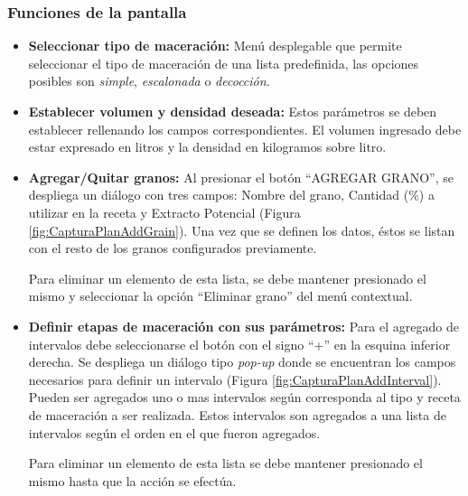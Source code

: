             \subsubsection{Funciones de la pantalla}
                \begin{itemize}
                    \item \textbf{Seleccionar tipo de maceración:} Menú desplegable que permite seleccionar el tipo de maceración de una lista predefinida, las opciones posibles son \textit{simple}, \textit{escalonada} o \textit{decocción}.
                    
                    \item \textbf{Establecer volumen y densidad deseada:} Estos parámetros se deben establecer rellenando los campos correspondientes. El volumen ingresado debe estar expresado en litros y la densidad en kilogramos sobre litro.
                    
                    \item \textbf{Agregar/Quitar granos:} Al presionar el botón ``AGREGAR GRANO'', se despliega un diálogo con tres campos: Nombre del grano, Cantidad (\%) a utilizar en la receta y Extracto Potencial (Figura \ref{fig:CapturaPlanAddGrain}). Una vez que se definen los datos, éstos se listan con el resto de los granos configurados previamente. %
                    
                        \par Para eliminar un elemento de esta lista, se debe mantener presionado el mismo y seleccionar la opción ``Eliminar grano'' del menú contextual.
                    
                    \item \textbf{Definir etapas de maceración con sus parámetros:} Para el agregado de intervalos debe seleccionarse el botón con el signo ``+'' en la esquina inferior derecha. Se despliega un diálogo tipo \textit{pop-up} donde se encuentran los campos necesarios para definir un intervalo (Figura \ref{fig:CapturaPlanAddInterval}). Pueden ser agregados uno o mas intervalos según corresponda al tipo y receta de maceración a ser realizada. Estos intervalos son agregados a una lista de intervalos según el orden en el que fueron agregados.
                    \par Para eliminar un elemento de esta lista se debe mantener presionado el mismo hasta que la acción se efectúa.
                    

\end{itemize}
